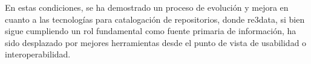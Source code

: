 \documentclass{article}
\begin{document}
En estas condiciones, se ha demostrado un proceso de evolución y mejora en cuanto a las tecnologías para catalogación de repositorios, donde re3data, si bien sigue cumpliendo un rol fundamental como fuente primaria de información, ha sido desplazado por mejores herramientas desde el punto de vista de usabilidad o interoperabilidad.\\





\end{document}
